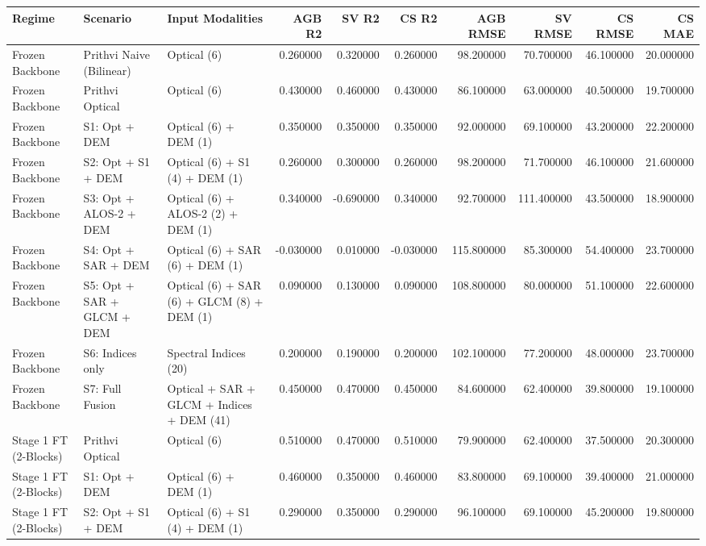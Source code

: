 \begin{tabular}{lllrrrrrrr}
\toprule
Regime & Scenario & Input Modalities & AGB R2 & SV R2 & CS R2 & AGB RMSE & SV RMSE & CS RMSE & CS MAE \\
\midrule
Frozen Backbone & Prithvi Naive (Bilinear) & Optical (6) & 0.260000 & 0.320000 & 0.260000 & 98.200000 & 70.700000 & 46.100000 & 20.000000 \\
Frozen Backbone & Prithvi Optical & Optical (6) & 0.430000 & 0.460000 & 0.430000 & 86.100000 & 63.000000 & 40.500000 & 19.700000 \\
Frozen Backbone & S1: Opt + DEM & Optical (6) + DEM (1) & 0.350000 & 0.350000 & 0.350000 & 92.000000 & 69.100000 & 43.200000 & 22.200000 \\
Frozen Backbone & S2: Opt + S1 + DEM & Optical (6) + S1 (4) + DEM (1) & 0.260000 & 0.300000 & 0.260000 & 98.200000 & 71.700000 & 46.100000 & 21.600000 \\
Frozen Backbone & S3: Opt + ALOS-2 + DEM & Optical (6) + ALOS-2 (2) + DEM (1) & 0.340000 & -0.690000 & 0.340000 & 92.700000 & 111.400000 & 43.500000 & 18.900000 \\
Frozen Backbone & S4: Opt + SAR + DEM & Optical (6) + SAR (6) + DEM (1) & -0.030000 & 0.010000 & -0.030000 & 115.800000 & 85.300000 & 54.400000 & 23.700000 \\
Frozen Backbone & S5: Opt + SAR + GLCM + DEM & Optical (6) + SAR (6) + GLCM (8) + DEM (1) & 0.090000 & 0.130000 & 0.090000 & 108.800000 & 80.000000 & 51.100000 & 22.600000 \\
Frozen Backbone & S6: Indices only & Spectral Indices (20) & 0.200000 & 0.190000 & 0.200000 & 102.100000 & 77.200000 & 48.000000 & 23.700000 \\
Frozen Backbone & S7: Full Fusion & Optical + SAR + GLCM + Indices + DEM (41) & 0.450000 & 0.470000 & 0.450000 & 84.600000 & 62.400000 & 39.800000 & 19.100000 \\
Stage 1 FT (2-Blocks) & Prithvi Optical & Optical (6) & 0.510000 & 0.470000 & 0.510000 & 79.900000 & 62.400000 & 37.500000 & 20.300000 \\
Stage 1 FT (2-Blocks) & S1: Opt + DEM & Optical (6) + DEM (1) & 0.460000 & 0.350000 & 0.460000 & 83.800000 & 69.100000 & 39.400000 & 21.000000 \\
Stage 1 FT (2-Blocks) & S2: Opt + S1 + DEM & Optical (6) + S1 (4) + DEM (1) & 0.290000 & 0.350000 & 0.290000 & 96.100000 & 69.100000 & 45.200000 & 19.800000 \\

\end{tabular}
